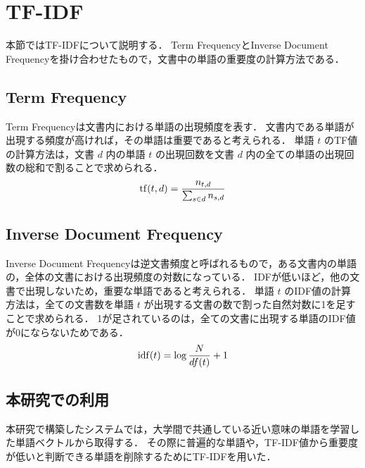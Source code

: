 \section{TF-IDF}
本節ではTF-IDFについて説明する．
Term FrequencyとInverse Document Frequencyを掛け合わせたもので，文書中の単語の重要度の計算方法\cite{tfidf}である．

\subsection{Term Frequency}
Term Frequencyは文書内における単語の出現頻度を表す．
文書内である単語が出現する頻度が高ければ，その単語は重要であると考えられる．
単語 $ t $ のTF値の計算方法は，文書 $ d $ 内の単語 $ t $ の出現回数を文書 $ d $ 内の全ての単語の出現回数の総和で割ることで求められる．
\begin{displaymath}
{\rm tf}(t, d) = \frac{n_{t, d}}{\sum_{s \in d} n_{s, d}}
\end{displaymath}

\subsection{Inverse Document Frequency}
Inverse Document Frequencyは逆文書頻度と呼ばれるもので，ある文書内の単語の，全体の文書における出現頻度の対数になっている．
IDFが低いほど，他の文書で出現しないため，重要な単語であると考えられる．
単語 $ t $ のIDF値の計算方法は，全ての文書数を単語 $ t $ が出現する文書の数で割った自然対数に1を足すことで求められる．
1が足されているのは，全ての文書に出現する単語のIDF値が0にならないためである．
\begin{displaymath}
{\rm idf}(t) = \log \frac{N}{df(t)} + 1
\end{displaymath}

\subsection{本研究での利用}
本研究で構築したシステムでは，大学間で共通している近い意味の単語を学習した単語ベクトルから取得する．
その際に普遍的な単語や，TF-IDF値から重要度が低いと判断できる単語を削除するためにTF-IDFを用いた．
